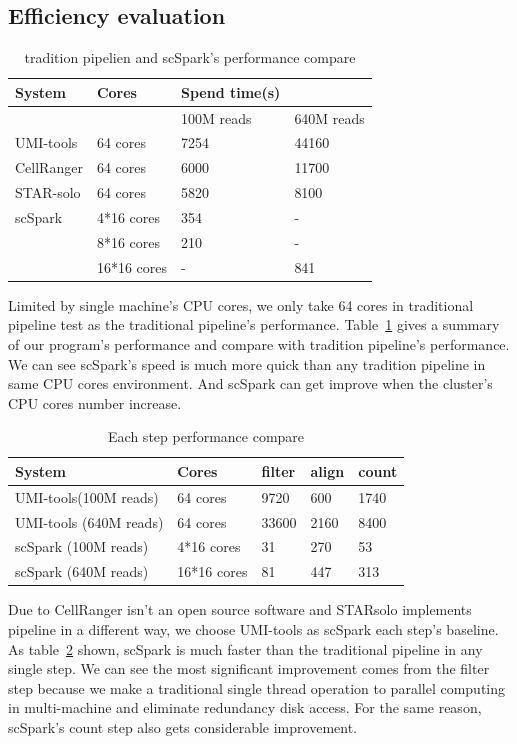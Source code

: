 \documentclass[conference]{IEEEtran}
\begin{document}
\subsection{Efficiency evaluation}
\begin{table}
  \centering
  \caption{tradition pipelien and scSpark's performance compare}\label{tab1}
  \begin{tabular}{|l | l | l  l|}
  \hline
  System &  Cores & Spend time(s) \\
  \hline
   &  & 100M reads & 640M reads \\
  \hline
  UMI-tools & 64 cores & 7254 & 44160 \\
  \hline
  CellRanger & 64 cores & 6000 & 11700 \\
  \hline
  STAR-solo & 64 cores &  5820 & 8100 \\
  \hline
  scSpark & 4*16 cores & 354 & - \\
   & 8*16 cores & 210 & - \\
   & 16*16 cores & - & 841 \\
  \hline
  \end{tabular}
\end{table}
Limited by single machine's CPU cores, we only take 64 cores in traditional pipeline test as the traditional pipeline's performance.
Table~\ref{tab1} gives a summary of our program's performance and compare with tradition pipeline's performance.
We can see scSpark's speed is much more quick than any tradition pipeline in same CPU cores environment.
And scSpark can get improve when the cluster's CPU cores number increase.
\begin{table}
  \centering
  \caption{Each step performance compare}\label{tab2}
  \begin{tabular}{|l | l | l | l | l|}
  \hline
  System & Cores & filter & align & count \\
  \hline
  UMI-tools(100M reads) & 64 cores & 9720 & 600 & 1740 \\
  \hline
  UMI-tools (640M reads) & 64 cores & 33600 & 2160 & 8400 \\
  \hline
  scSpark (100M reads) & 4*16 cores & 31 & 270 & 53 \\
  \hline
  scSpark (640M reads) & 16*16 cores & 81 & 447 & 313 \\
  \hline
  \end{tabular}
\end{table}
Due to CellRanger isn't an open source software and STARsolo implements pipeline in a different way, we choose UMI-tools as scSpark each step's baseline.
As table~\ref{tab2} shown, scSpark is much faster than the traditional pipeline in any single step.
We can see the most significant improvement comes from the filter step because we make a traditional single thread operation to parallel computing in multi-machine and eliminate redundancy disk access.
For the same reason, scSpark's count step also gets considerable improvement.
\end{document}
